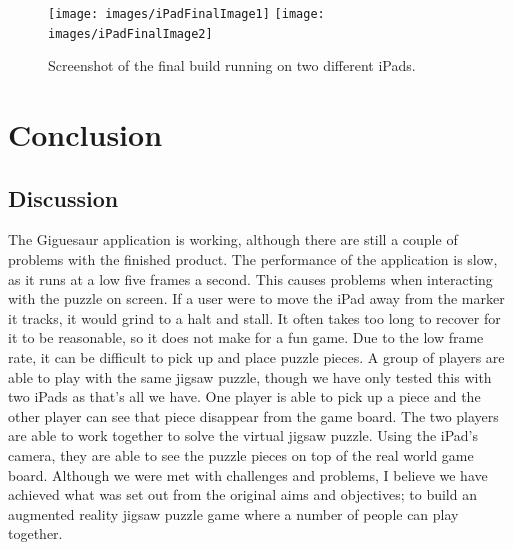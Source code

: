 \documentclass{article}
\begin{document}
\begin{figure}[ht]
\begin{center}
\centerline{
\texttt{[image: images/iPadFinalImage1]}
\texttt{[image: images/iPadFinalImage2]}
}
\caption{Screenshot of the final build running on two different iPads.}
\label{fig:iPadFinal}
\end{center}
\end{figure}


\section{Conclusion}

\subsection{Discussion}
The Giguesaur application is working, although there are still a couple of
problems with the finished product. The performance of the application is slow,
as it runs at a low five frames a second. This causes problems when interacting
with the puzzle on screen. If a user were to move the iPad away from the marker
it tracks, it would grind to a halt and stall. It often takes too long to
recover for it to be reasonable, so it does not make for a fun game. Due to the
low frame rate, it can be difficult to pick up and place puzzle pieces. A group
of players are able to play with the same jigsaw puzzle, though we have only
tested this with two iPads as that's all we have. One player is able to pick up
a piece and the other player can see that piece disappear from the game
board. The two players are able to work together to solve the virtual jigsaw
puzzle. Using the iPad's camera, they are able to see the puzzle pieces on top
of the real world game board. Although we were met with challenges and problems, I
believe we have achieved what was set out from the original aims and objectives;
to build an augmented reality jigsaw puzzle game where a number of people can
play together.
\end{document}
